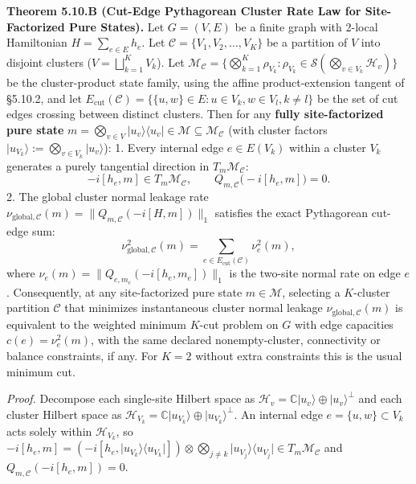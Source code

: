 \documentclass[
  11pt,
]{article}
\begin{document}
\textbf{Theorem 5.10.B (Cut-Edge Pythagorean Cluster Rate Law for Site-Factorized Pure States).} Let \(G=(V,E)\) be a finite graph with 2-local Hamiltonian \(H = \sum_{e\in E} h_e\). Let \(\mathcal{C} = \{V_1, V_2, \dots, V_K\}\) be a partition of \(V\) into disjoint clusters (\(V = \bigsqcup_{k=1}^K V_k\)). Let \(\mathcal{M}_{\mathcal{C}} = \{\bigotimes_{k=1}^K \rho_{V_k} : \rho_{V_k} \in \mathcal{S}(\bigotimes_{v\in V_k} \mathcal{H}_v)\}\) be the cluster-product state family, using the affine product-extension tangent of §5.10.2, and let \(E_{\mathrm{cut}}(\mathcal{C}) = \{\{u,w\} \in E : u \in V_k, w \in V_l, k \ne l\}\) be the set of cut edges crossing between distinct clusters.
Then for any \textbf{fully site-factorized pure state} \(m = \bigotimes_{v\in V} \lvert u_v\rangle\langle u_v\rvert \in \mathcal{M} \subseteq \mathcal{M}_{\mathcal{C}}\) (with cluster factors \(\lvert u_{V_k}\rangle := \bigotimes_{v\in V_k}\lvert u_v\rangle\)):
1. Every internal edge \(e \in E(V_k)\) within a cluster \(V_k\) generates a purely tangential direction in \(T_m\mathcal{M}_{\mathcal{C}}\):
\[
-i[h_e, m] \in T_m \mathcal{M}_{\mathcal{C}}, \qquad Q_{m,\mathcal{C}}\bigl(-i[h_e, m]\bigr) = 0.
\]
2. The global cluster normal leakage rate \(\nu_{\mathrm{global},\mathcal{C}}(m) = \lVert Q_{m,\mathcal{C}}(-i[H, m])\rVert_1\) satisfies the exact Pythagorean cut-edge sum:
\[
\nu_{\mathrm{global},\mathcal{C}}^2(m) = \sum_{e\in E_{\mathrm{cut}}(\mathcal{C})} \nu_e^2(m),
\]
where \(\nu_e(m) = \lVert Q_{e, m_e}(-i[h_e, m_e])\rVert_1\) is the two-site normal rate on edge \(e\). Consequently, at any site-factorized pure state \(m\in\mathcal{M}\), selecting a \(K\)-cluster partition \(\mathcal{C}\) that minimizes instantaneous cluster normal leakage \(\nu_{\mathrm{global},\mathcal{C}}(m)\) is equivalent to the weighted minimum \(K\)-cut problem on \(G\) with edge capacities \(c(e)=\nu_e^2(m)\), with the same declared nonempty-cluster, connectivity or balance constraints, if any. For \(K=2\) without extra constraints this is the usual minimum cut.

\emph{Proof.} Decompose each single-site Hilbert space as \(\mathcal{H}_v = \mathbb{C}\lvert u_v\rangle \oplus \lvert u_v\rangle^\perp\) and each cluster Hilbert space as \(\mathcal{H}_{V_k} = \mathbb{C}\lvert u_{V_k}\rangle \oplus \lvert u_{V_k}\rangle^\perp\).
An internal edge \(e=\{u,w\} \subset V_k\) acts solely within \(\mathcal{H}_{V_k}\), so \(-i[h_e, m] = (-i[h_e, \lvert u_{V_k}\rangle\langle u_{V_k}\rvert]) \otimes \bigotimes_{j\ne k} \lvert u_{V_j}\rangle\langle u_{V_j}\rvert \in T_m \mathcal{M}_{\mathcal{C}}\) and \(Q_{m,\mathcal{C}}(-i[h_e, m]) = 0\).
\end{document}
